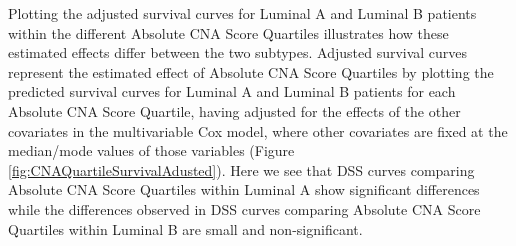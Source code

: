 Plotting the adjusted survival curves for Luminal A and Luminal B patients within the different Absolute CNA Score Quartiles illustrates how these estimated effects differ between the two subtypes. Adjusted survival curves represent the estimated effect of Absolute CNA Score Quartiles by plotting the predicted survival curves for Luminal A and Luminal B patients for each Absolute CNA Score Quartile, having adjusted for the effects of the other covariates in the multivariable Cox model, where other covariates are fixed at the median/mode values of those variables (Figure \ref{fig:CNAQuartileSurvivalAdusted}). Here we see that DSS curves comparing Absolute CNA Score Quartiles within Luminal A show significant differences while the differences observed in DSS curves comparing Absolute CNA Score Quartiles within Luminal B are small and non-significant.  

